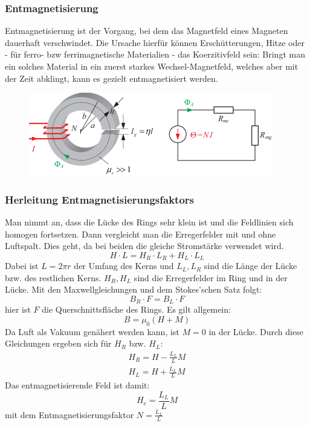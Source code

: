         \subsubsection*{Entmagnetisierung}
    		Entmagnetisierung ist der Vorgang, bei dem das Magnetfeld eines Magneten dauerhaft verschwindet.
            Die Ursache hierfür können Erschütterungen, Hitze oder - für ferro- bzw ferrimagnetische Materialien - das Koerzitivfeld sein: Bringt man ein solches Material
            in ein zuerst starkes Wechsel-Magnetfeld, welches aber mit der Zeit abklingt, kann es gezielt entmagnetisiert werden.
            \begin{figure}[H]
                \centering
                \includegraphics{images/Ringkern}
            \end{figure}
        \subsubsection*{Herleitung Entmagnetisierungsfaktors}
            Man nimmt an, dass die Lücke des Rings sehr klein ist und die Feldlinien sich homogen
            fortsetzen. Dann vergleicht man die Erregerfelder mit und ohne Luftspalt. Dies geht, da
            bei beiden die gleiche Stromstärke verwendet wird.
            \begin{equation}
                H \cdot L = H_R \cdot L_R + H_L \cdot L_L
            \end{equation}
            Dabei ist $L = 2 \pi r$ der Umfang des Kerns und $L_L, L_R$ sind die Länge der Lücke bzw. des restlichen Kerns.
            $H_R, H_L$ sind die Erregerfelder im Ring und in der Lücke.
            Mit den Maxwellgleichungen und dem Stokes'schen Satz folgt:
            \begin{equation}
                B_R \cdot F = B_L \cdot F
            \end{equation}
            hier ist $F$ die Querschnittsfläche des Rings. Es gilt allgemein:
            \begin{equation}
                B = \mu_0 (H + M)
            \end{equation}
            Da Luft als Vakuum genähert werden kann, ist $M=0$ in der Lücke.
            Durch diese Gleichungen ergeben sich für $H_R$ bzw. $H_L$:
            \begin{align*}
                H_R = H - \frac{L_L}{L} M\\
                H_L = H + \frac{L_L}{L} M
            \end{align*}
            Das entmagnetisierende Feld ist damit:
            \begin{equation}
                H_e = \frac{L_L}{L} M
            \end{equation}
            mit dem Entmagnetisierungsfaktor $N = \frac{L_L}{L}$
